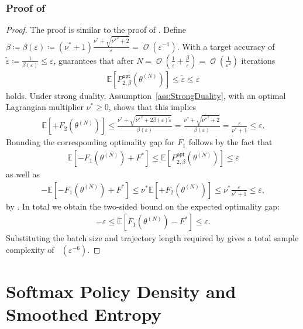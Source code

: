 \documentclass{article}
\newcommand{\Assref}[1]{Assumption~\ref{#1}}
\theoremstyle{plain}
\theoremstyle{definition}
\theoremstyle{remark}
\DeclareMathOperator{\OOTildeSym}{\widetilde{\mathcal{O}}}
\DeclareMathOperator{\OOSym}{\mathcal{O}}
\newcommand{\OOTilde}[1]{{\OOTildeSym\!\left(#1\right)}}
\newcommand{\OO}[1]{{\OOSym\!\left(#1\right)}}
\def\epsilon{{\varepsilon}}
\newcommand{\Exp}[1]{{ \mathbb{E}}\!\left[#1\right]}
\DeclarePairedDelimiter{\plus}{[}{]_{+}}
\newcommand{\define}{\coloneqq}
\def\xx{{\theta}}
\def\xxN{\xx^{(N)}}
\def\nuOpt{{\nu^{*}}}
\def\optLabel{\mathsf{opt}}
\newcommand{\penOpt}[1]{P^\optLabel_{#1}}
\def\Fopt{{F^*}}
\def\epsTilde{{\tilde{\epsilon}}}
\begin{document}
\subsubsection{Proof of }
\label{cor:FinalRateTranslation-PROOF}
\begin{proof}
 The proof is similar to the proof of
 .
 Define $\beta \define \beta(\epsilon) \define (\nuOpt + 1)\frac{\nuOpt
   + \sqrt{\nuOpt^2 + 2}}{\epsilon} = \OO{\epsilon^{-1}}$. With
 a target accuracy of $\epsTilde \define \frac{1}{\beta(\epsilon)} \leq \epsilon$,
  guarantees that after
 $N = \OO{\frac{1}{\epsTilde} + \frac{\beta}{\epsTilde}} = \OO{\frac{1}{\epsilon^2}}$ iterations
 \begin{align*}
  \Exp{\penOpt{2, \beta}(\xxN)} \leq \epsTilde \leq \epsilon
 \end{align*}
 holds. Under strong duality, \Assref{ass:StrongDuality}, with
 an optimal Lagrangian multiplier $\nuOpt \geq 0$,
  shows
 that this implies
 \begin{align*}
  \Exp{\plus{F_2(\xxN)}} \leq \frac{\nuOpt + \sqrt{\nuOpt^2
    + 2\beta(\epsilon) \epsTilde}}{\beta(\epsilon)}
  = \frac{\nuOpt + \sqrt{\nuOpt^2 + 2}}{\beta(\epsilon)}
  = \frac{\epsilon}{\nuOpt + 1} \leq \epsilon.
 \end{align*}
 Bounding the corresponding optimality gap for $F_1$ follows by the fact that
 \begin{align*}
  \Exp{-F_1(\xxN) + \Fopt} \leq \Exp{\penOpt{2, \beta}(\xxN)} \leq \epsilon
 \end{align*}
 as well as
 \begin{align*}
  -\Exp{-F_1(\xxN) + \Fopt} \leq \nuOpt \Exp{\plus{F_2(\xxN)}}\leq
  \nuOpt \frac{\epsilon}{\nuOpt + 1}
  \leq \epsilon,
 \end{align*}
 by . In total
 we obtain the two-sided bound on the expected optimality gap:
 \begin{align*}
  -\epsilon \leq \Exp{F_1(\xxN) - \Fopt} \leq \epsilon.
 \end{align*}
 Substituting the batch size and trajectory length required by
  gives a total sample complexity of
 $\OOTilde{\epsilon^{-6}}$.
\end{proof}

\newpage
\section{Softmax Policy Density and Smoothed Entropy}
\label{sec:AppendixConcretePolicyClass}
\end{document}
